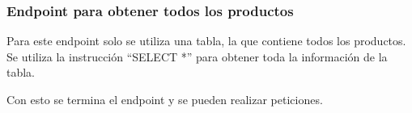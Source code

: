 \subsubsection{Endpoint para obtener todos los productos}
Para este endpoint solo se utiliza una tabla, la que contiene todos los productos. Se utiliza la instrucción ``SELECT *'' para obtener toda la información de la tabla.

Con esto se termina el endpoint y se pueden realizar peticiones.